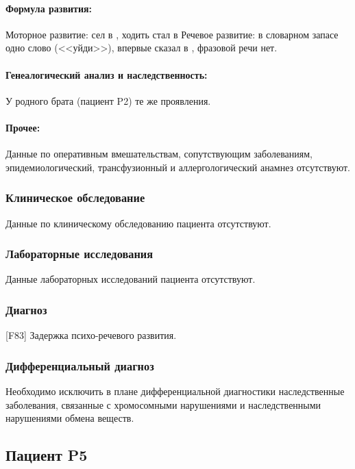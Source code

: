 \documentclass[a4paper,14pt]{extarticle}
\newcommand{\months}{мес.}
\newcommand{\DS}[2]{[#2] #1}
\begin{document}
\paragraph{Формула развития:} Моторное развитие: сел в \numprint[\months]{7}, ходить стал в \numprint[\months]{10} 
Речевое развитие: в словарном запасе одно слово (<<уйди>>), впервые сказал в , фразовой речи нет.

\paragraph{Генеалогический анализ и наследственность:} У родного брата (пациент P2) те же проявления.

\paragraph{Прочее:} Данные по оперативным вмешательствам, сопутствующим заболеваниям, эпидемиологический, трансфузионный и аллергологический анамнез отсутствуют.

\subsubsection*{Клиническое обследование}

Данные по клиническому обследованию пациента отсутствуют.

\subsubsection*{Лабораторные исследования}

Данные лабораторных исследований пациента отсутствуют.

\subsubsection*{Диагноз}

\DS{Задержка психо-речевого развития}{F83}.

\subsubsection*{Дифференциальный диагноз}

Необходимо исключить в плане дифференциальной диагностики наследственные заболевания, связанные с хромосомными нарушениями и наследственными нарушениями обмена  веществ. 

\newpage
\subsection*{Пациент P5}
\end{document}
